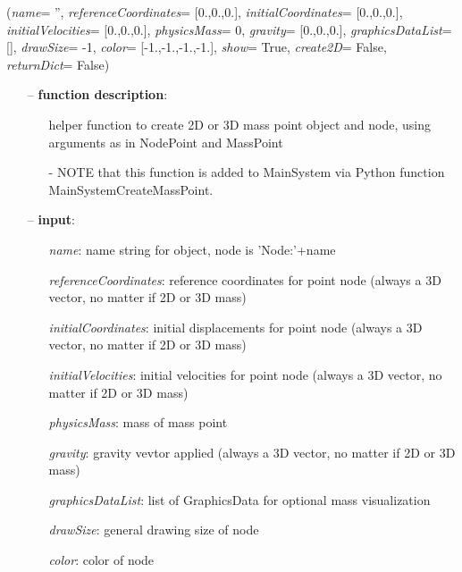 %
\begin{flushleft}
\label{sec:mainsystemextensions:CreateMassPoint}
({\it name}= '', {\it referenceCoordinates}= [0.,0.,0.], {\it initialCoordinates}= [0.,0.,0.], {\it initialVelocities}= [0.,0.,0.], {\it physicsMass}= 0, {\it gravity}= [0.,0.,0.], {\it graphicsDataList}= [], {\it drawSize}= -1, {\it color}= [-1.,-1.,-1.,-1.], {\it show}= True, {\it create2D}= False, {\it returnDict}= False)
\end{flushleft}
\setlength{\itemindent}{0.7cm}
\begin{itemize}[leftmargin=0.7cm]
\item[--]
{\bf function description}: \vspace{-6pt}
\begin{itemize}[leftmargin=1.2cm]
\setlength{\itemindent}{-0.7cm}
\item[]helper function to create 2D or 3D mass point object and node, using arguments as in NodePoint and MassPoint
\item[]- NOTE that this function is added to MainSystem via Python function MainSystemCreateMassPoint.
\end{itemize}
\item[--]
{\bf input}: \vspace{-6pt}
\begin{itemize}[leftmargin=1.2cm]
\setlength{\itemindent}{-0.7cm}
\item[]{\it name}: name string for object, node is 'Node:'+name
\item[]{\it referenceCoordinates}: reference coordinates for point node (always a 3D vector, no matter if 2D or 3D mass)
\item[]{\it initialCoordinates}: initial displacements for point node (always a 3D vector, no matter if 2D or 3D mass)
\item[]{\it initialVelocities}: initial velocities for point node (always a 3D vector, no matter if 2D or 3D mass)
\item[]{\it physicsMass}: mass of mass point
\item[]{\it gravity}: gravity vevtor applied (always a 3D vector, no matter if 2D or 3D mass)
\item[]{\it graphicsDataList}: list of GraphicsData for optional mass visualization
\item[]{\it drawSize}: general drawing size of node
\item[]{\it color}: color of node

\end{itemize}
\end{itemize}

